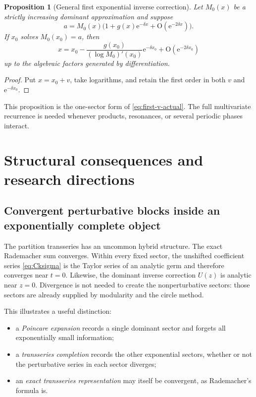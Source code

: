 \documentclass[11pt,a4paper]{article}
\numberwithin{equation}{section}
\newtheorem{proposition}[theorem]{Proposition}
\theoremstyle{remark}
\newcommand{\e}{\mathrm e}
\newcommand{\bigO}{\mathrm O}
\begin{document}
\begin{proposition}[General first exponential inverse correction]\label{prop:general-first-correction}
Let $M_0(x)$ be a strictly increasing dominant approximation and suppose
\[
 a=M_0(x)\bigl(1+g(x)\e^{-\delta x}+\bigO(\e^{-2\delta x})\bigr).
\]
If $x_0$ solves $M_0(x_0)=a$, then
\begin{equation}\label{eq:general-first-correction}
 x=x_0-\frac{g(x_0)}{(\log M_0)'(x_0)}\e^{-\delta x_0}
 +\bigO(\e^{-2\delta x_0})
\end{equation}
up to the algebraic factors generated by differentiation.
\end{proposition}

\begin{proof}
Put $x=x_0+v$, take logarithms, and retain the first order in both $v$ and $\e^{-\delta x_0}$.
\end{proof}

This proposition is the one-sector form of \cref{eq:first-v-actual}.  The full multivariate recurrence is needed whenever products, resonances, or several periodic phases interact.

\section{Structural consequences and research directions}\label{sec:research-directions}

\subsection{Convergent perturbative blocks inside an exponentially complete object}

The partition transseries has an uncommon hybrid structure.  The exact Rademacher sum converges.  Within every fixed sector, the unshifted coefficient series \cref{eq:Cksigma} is the Taylor series of an analytic germ and therefore converges near $t=0$.  Likewise, the dominant inverse correction $U(z)$ is analytic near $z=0$.  Divergence is not needed to create the nonperturbative sectors: those sectors are already supplied by modularity and the circle method.

This illustrates a useful distinction:
\begin{itemize}
\item a \emph{Poincare expansion} records a single dominant sector and forgets all exponentially small information;
\item a \emph{transseries completion} records the other exponential sectors, whether or not the perturbative series in each sector diverges;
\item an \emph{exact transseries representation} may itself be convergent, as Rademacher's formula is.
\end{itemize}
\end{document}
